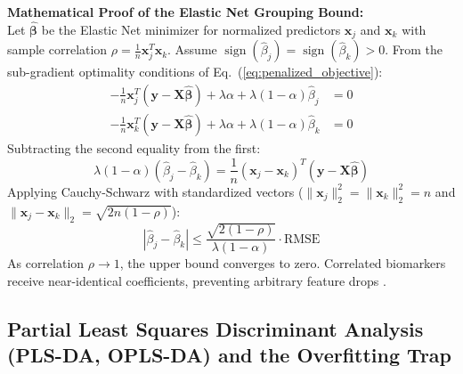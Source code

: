 \documentclass[11pt,oneside]{book}
\begin{document}
\begin{deepdive}[top=3pt, bottom=3pt, before skip=3pt, after skip=3pt]
\textbf{Mathematical Proof of the Elastic Net Grouping Bound:}\\
Let $\hat{\boldsymbol{\beta}}$ be the Elastic Net minimizer for normalized predictors $\mathbf{x}_j$ and $\mathbf{x}_k$ with sample correlation $\rho = \frac{1}{n}\mathbf{x}_j^T \mathbf{x}_k$. Assume $\operatorname{sign}(\hat{\beta}_j) = \operatorname{sign}(\hat{\beta}_k) > 0$.
From the sub-gradient optimality conditions of Eq.~(\ref{eq:penalized_objective}):
\begin{align}
-\frac{1}{n}\mathbf{x}_j^T (\mathbf{y} - \mathbf{X}\hat{\boldsymbol{\beta}}) + \lambda \alpha + \lambda(1 - \alpha)\hat{\beta}_j &= 0 \\
-\frac{1}{n}\mathbf{x}_k^T (\mathbf{y} - \mathbf{X}\hat{\boldsymbol{\beta}}) + \lambda \alpha + \lambda(1 - \alpha)\hat{\beta}_k &= 0
\end{align}
Subtracting the second equality from the first:
\begin{equation}
\lambda(1 - \alpha)(\hat{\beta}_j - \hat{\beta}_k) = \frac{1}{n}(\mathbf{x}_j - \mathbf{x}_k)^T (\mathbf{y} - \mathbf{X}\hat{\boldsymbol{\beta}})
\end{equation}
Applying Cauchy-Schwarz with standardized vectors ($\|\mathbf{x}_j\|_2^2 = \|\mathbf{x}_k\|_2^2 = n$ and $\|\mathbf{x}_j - \mathbf{x}_k\|_2 = \sqrt{2n(1 - \rho)}$):
\begin{equation}
|\hat{\beta}_j - \hat{\beta}_k| \le \frac{\sqrt{2(1 - \rho)}}{\lambda(1 - \alpha)} \cdot \text{RMSE}
\label{eq:grouping_bound}
\end{equation}
As correlation $\rho \to 1$, the upper bound converges to zero. Correlated biomarkers receive near-identical coefficients, preventing arbitrary feature drops \cite{zou2005regularization}.
\end{deepdive}

\clearpage

\subsection{Partial Least Squares Discriminant Analysis (PLS-DA, OPLS-DA) and the Overfitting Trap}
\end{document}
